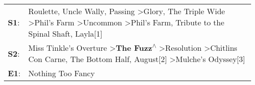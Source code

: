 \begin{supertabular}{p{0.03\textwidth}p{0.92\textwidth}}
 \textbf{S1}:  &  Roulette\textsuperscript{}, \enspace Uncle Wally\textsuperscript{}, \enspace Passing\textsuperscript{} \textgreater \enspace Glory\textsuperscript{}, \enspace The Triple Wide\textsuperscript{} \textgreater \enspace Phil's Farm\textsuperscript{} \textgreater \enspace Uncommon\textsuperscript{} \textgreater \enspace Phil's Farm\textsuperscript{}, \enspace Tribute to the Spinal Shaft\textsuperscript{}, \enspace Layla[1]\textsuperscript{}  \enspace  \\
 \textbf{S2}:  &                                                                                  Miss Tinkle's Overture\textsuperscript{} \textgreater \enspace \textbf{The Fuzz\textsuperscript{$\wedge$}} \textgreater \enspace Resolution\textsuperscript{} \textgreater \enspace Chitlins Con Carne\textsuperscript{}, \enspace The Bottom Half\textsuperscript{}, \enspace August[2]\textsuperscript{} \textgreater \enspace Mulche's Odyssey[3]\textsuperscript{}  \enspace  \\
 \textbf{E1}:  &                                                                                                                                                                                                                                                                                                                                                                                                                     Nothing Too Fancy\textsuperscript{}  \enspace  \\
\end{supertabular}
